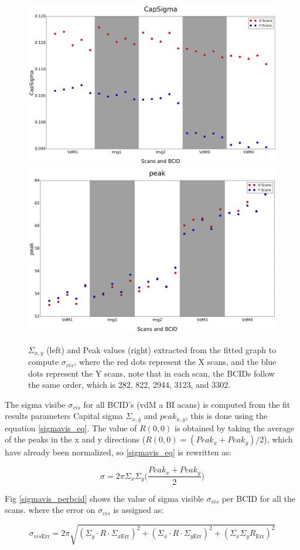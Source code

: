 \begin{center}
  \begin{figure}[h!]
    \centering
    \includegraphics[width=.49\textwidth]{Chapter4/DGConst_CapSigma.png}
    \includegraphics[width=.48\textwidth]{Chapter4/DGConst_peak.png}
    \caption[$\Sigma_{x,y}$ and peak values for all scan pairs]{$\Sigma_{x,y}$ (left) and Peak values (right) extracted from the fitted graph to compute $\sigma_{vis}$, where the red dots represent the X scans, and the blue dots represent the Y scans, note that in each scan, the BCIDs follow the same order, which is 282, 822, 2944, 3123, and 3302.} 
    \label{capsigma_peak}
  \end{figure}
\end{center}

The sigma visibe $\sigma_{vis}$ for all BCID's (vdM a BI acans) is computed from the fit results parameters Capital sigma $\Sigma_{x,y}$ and $peak_{x,y}$, this is done using the equation \ref{sigmavis_eq}. The value of $R(0,0)$ is obtained by taking the average of the peaks in the x and y directions ($R(0,0)=(Peak_{x}+Peak_{y})/2$), which have already been normalized, so \ref{sigmavis_eq} is rewritten as:

\begin{equation}
 \sigma= 2\pi \Sigma_{x} \Sigma_{y} \Biggl( \frac{Peak_{x}+Peak_{y}}{2} \Biggl)
 \end{equation}
 
Fig \ref{sigmavis_perbcid} shows the  value of sigma visible $\sigma_{vis}$ per BCID for all the scans. where the error on $\sigma_{vis}$ is assigned as: 

\begin{equation}
\sigma_{vis\text{Err}}= 2 \pi \sqrt{ (\Sigma_{y} \cdot R \cdot \Sigma_{x\text{Err}})^{2} + (\Sigma_{x} \cdot R \cdot \Sigma_{y \text{Err}})^{2} + (\Sigma_{x} \Sigma_{y} R_{\text{Err}})^{2} }
\end{equation}

